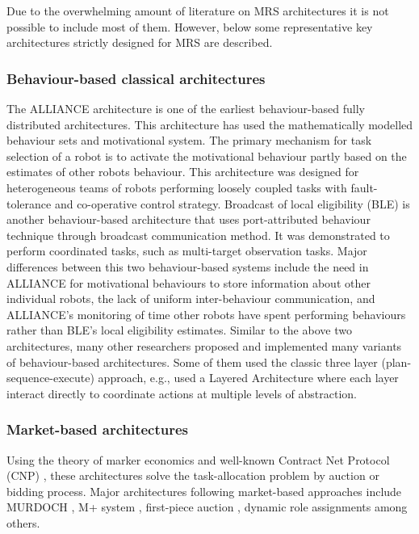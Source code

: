 Due to the overwhelming amount of literature on MRS architectures it is not possible to include most of them. However, below some representative key architectures strictly designed  for MRS are described. 

\subsubsection*{Behaviour-based classical architectures}
The ALLIANCE architecture \cite{Parker1998} is one of the earliest behaviour-based fully distributed architectures. This architecture has used the mathematically modelled behaviour sets and motivational system. The primary mechanism for task selection of a robot is to activate the motivational behaviour partly based on the estimates of other robots behaviour. This architecture was designed for heterogeneous teams of robots  performing loosely coupled tasks with fault-tolerance and co-operative control strategy. Broadcast of local eligibility (BLE) \cite{Werger2001} is another behaviour-based architecture that uses port-attributed behaviour technique through broadcast communication method. It was demonstrated to perform coordinated tasks, such as multi-target observation tasks. Major differences between this two behaviour-based systems include the need in ALLIANCE for motivational behaviours to store information about other individual robots, the lack of uniform inter-behaviour communication, and ALLIANCE's monitoring of time other robots have spent performing behaviours rather than BLE's local eligibility estimates. Similar to the above two architectures, many other researchers proposed and implemented many variants of behaviour-based architectures. Some of them used the classic three layer (plan-sequence-execute) approach, e.g., \cite{Simmons+2002} used a Layered Architecture where each layer interact directly to coordinate actions at multiple levels of abstraction. 

\subsubsection*{Market-based architectures}
Using the theory of marker economics and well-known Contract Net Protocol (CNP) \cite{Davis1988+}, these architectures solve the task-allocation problem by auction or bidding process. Major architectures following market-based approaches include MURDOCH \cite{Gerkey+2002}, M+ system \cite{Botelho+1999}, first-piece auction \cite{Zlot+2002}, dynamic role assignments \cite{Chaimowicz2002} among others. 


